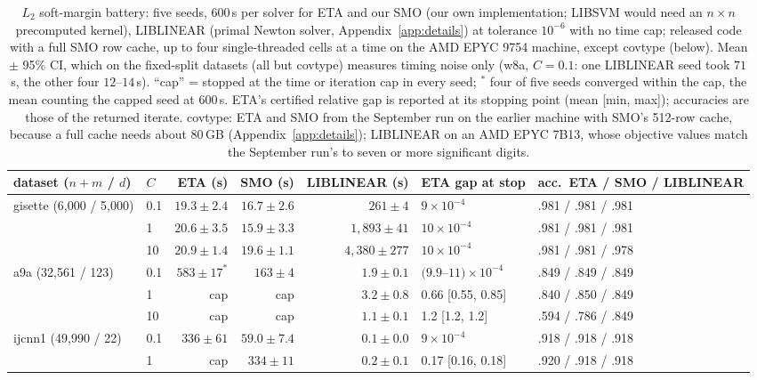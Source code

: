 \documentclass{opt2026}   %
\begin{document}
\begin{table}[h]\centering\scriptsize\setlength{\tabcolsep}{3pt}
\caption{$L_2$ soft-margin battery: five seeds, 600\,s per solver for
ETA and our SMO (our own implementation; LIBSVM would need an $n\times n$
precomputed kernel), LIBLINEAR
(primal Newton solver, Appendix~\ref{app:details}) at tolerance
$10^{-6}$ with no time cap; released code with a full SMO row cache, up to four
single-threaded cells at a time on the AMD EPYC 9754 machine, except
covtype (below). Mean $\pm$ 95\% CI, which on the fixed-split datasets
(all but covtype) measures timing noise only (w8a, $C{=}0.1$: one
LIBLINEAR seed took $71$\,s, the other four $12$--$14$\,s). ``cap'' = stopped at the time or iteration cap in every seed; $^\ast$ four of five seeds converged within
the cap, the mean counting the capped seed at $600$\,s. ETA's certified relative
gap is reported at its stopping point (mean [min, max]); accuracies are
those of the returned iterate. covtype: ETA and SMO from the September
run on the earlier machine with SMO's 512-row cache, because a full
cache needs about $80$\,GB (Appendix~\ref{app:details}); LIBLINEAR on an
AMD EPYC 7B13, whose objective values match the September run's to seven or more
significant digits.}\label{tab:l2}
\begin{tabular}{llrrrll}
\toprule
dataset ($n+m$ / $d$) & $C$ & ETA (s) & SMO (s) & LIBLINEAR (s) & ETA gap at stop & acc.\ ETA / SMO / LIBLINEAR \\
\midrule
gisette (6,000 / 5,000) & 0.1 & $19.3\pm2.4$ & $16.7\pm2.6$ & $261\pm4$ & $9\times10^{-4}$ & .981 / .981 / .981 \\
 & 1 & $20.6\pm3.5$ & $15.9\pm3.3$ & $1{,}893\pm41$ & $10\times10^{-4}$ & .981 / .981 / .981 \\
 & 10 & $20.9\pm1.4$ & $19.6\pm1.1$ & $4{,}380\pm277$ & $10\times10^{-4}$ & .981 / .981 / .978 \\
\midrule
a9a (32,561 / 123) & 0.1 & $583\pm17^{\ast}$ & $163\pm4$ & $1.9\pm0.1$ & $(9.9$--$11)\times10^{-4}$ & .849 / .849 / .849 \\
 & 1 & cap & cap & $3.2\pm0.8$ & 0.66 [0.55, 0.85] & .840 / .850 / .849 \\
 & 10 & cap & cap & $1.1\pm0.1$ & 1.2 [1.2, 1.2] & .594 / .786 / .849 \\
ijcnn1 (49,990 / 22) & 0.1 & $336\pm61$ & $59.0\pm7.4$ & $0.1\pm0.0$ & $9\times10^{-4}$ & .918 / .918 / .918 \\
 & 1 & cap & $334\pm11$ & $0.2\pm0.1$ & 0.17 [0.16, 0.18] & .920 / .918 / .918 \\

\end{tabular}
\end{table}
\end{document}
